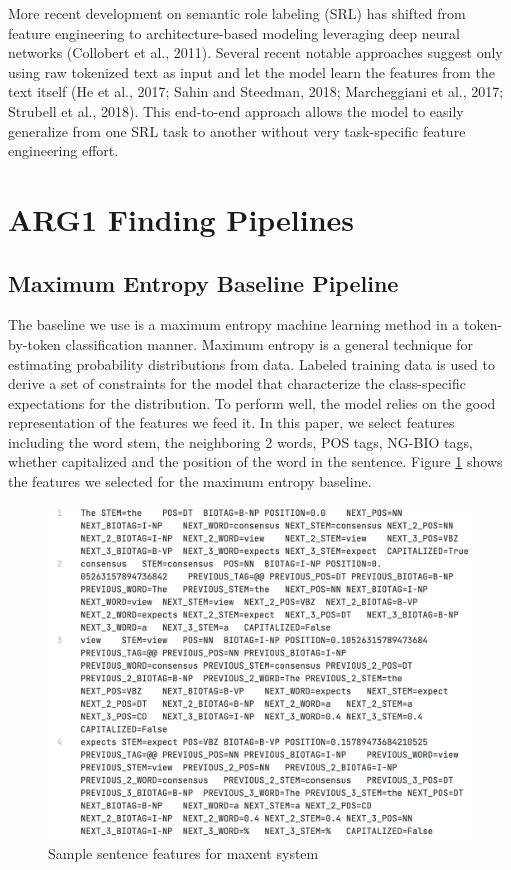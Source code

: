 \documentclass[11pt]{article}
\begin{document}
More recent development on semantic role labeling (SRL) has shifted from feature engineering to architecture-based modeling leveraging deep neural networks (Collobert
et al., 2011). Several recent notable approaches suggest only using raw tokenized text as input and let the model learn the features from the text itself (He et al., 2017; Sahin and Steedman, 2018; Marcheggiani et al., 2017; Strubell et al., 2018). This end-to-end approach allows the model to easily generalize from one SRL task to another without very task-specific feature engineering effort.

\section{ARG1 Finding Pipelines}

\subsection{Maximum Entropy Baseline Pipeline}

The baseline we use is a maximum entropy machine learning method in a token-by-token classification manner. Maximum entropy is a general technique for estimating probability distributions from data. Labeled training data
is used to derive a set of constraints for the model that
characterize the class-specific expectations for the distribution. To perform well, the model relies on the good representation of the features we feed it. In this paper, we select features including the word stem, the neighboring 2 words, POS tags, NG-BIO tags, whether capitalized and the position of the word in the sentence. Figure \ref{fig:maxent-feature-sample} shows the features we selected for the maximum entropy baseline.

\begin{figure}[h]
  \centering
  \includegraphics[width=\linewidth]{assets/maxent-feature-sample.png}
  \caption{Sample sentence features for maxent system}
  \label{fig:maxent-feature-sample}
\end{figure}
\end{document}
